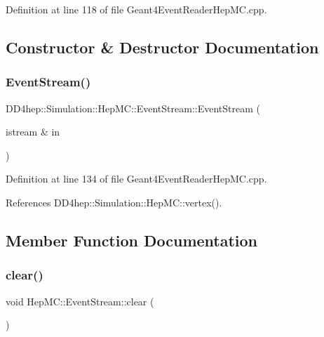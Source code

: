 Definition at line 118 of file Geant4\+Event\+Reader\+Hep\+M\+C.\+cpp.



\subsection{Constructor \& Destructor Documentation}
\hypertarget{class_d_d4hep_1_1_simulation_1_1_hep_m_c_1_1_event_stream_a73b3cc7b9dee4ad7e9e2dcf17a09e896}{}\label{class_d_d4hep_1_1_simulation_1_1_hep_m_c_1_1_event_stream_a73b3cc7b9dee4ad7e9e2dcf17a09e896} 
\subsubsection{\texorpdfstring{Event\+Stream()}{EventStream()}}
{\footnotesize\ttfamily D\+D4hep\+::\+Simulation\+::\+Hep\+M\+C\+::\+Event\+Stream\+::\+Event\+Stream (\begin{DoxyParamCaption}\item[{istream \&}]{in }\end{DoxyParamCaption})\hspace{0.3cm}{\ttfamily [inline]}}



Definition at line 134 of file Geant4\+Event\+Reader\+Hep\+M\+C.\+cpp.



References D\+D4hep\+::\+Simulation\+::\+Hep\+M\+C\+::vertex().



\subsection{Member Function Documentation}
\hypertarget{class_d_d4hep_1_1_simulation_1_1_hep_m_c_1_1_event_stream_a154b4f2355eac25743ec73982d588c39}{}\label{class_d_d4hep_1_1_simulation_1_1_hep_m_c_1_1_event_stream_a154b4f2355eac25743ec73982d588c39} 
\subsubsection{\texorpdfstring{clear()}{clear()}}
{\footnotesize\ttfamily void Hep\+M\+C\+::\+Event\+Stream\+::clear (\begin{DoxyParamCaption}{ }\end{DoxyParamCaption})}




